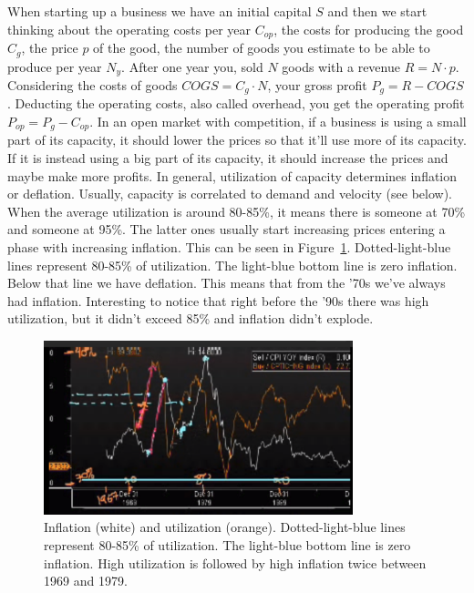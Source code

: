 When starting up a business we have an initial capital $S$ and then we start thinking about the operating costs per year $C_{op}$, the costs for producing the good $C_g$, the price $p$ of the good, the number of goods you estimate to be able to produce per year $N_y$. After one year you, sold $N$ goods with a revenue $R = N \cdot p$. Considering the costs of goods $COGS = C_g \cdot N$, your gross profit $P_g = R - COGS$. Deducting the operating costs, also called overhead, you get the operating profit $P_{op} = P_g - C_{op}$. 
In an open market with competition, if a business is using a small part of its capacity, it should lower the prices so that it'll use more of its capacity. If it is instead using a big part of its capacity, it should increase the prices and maybe make more profits. In general, utilization of capacity determines inflation or deflation. Usually, capacity is correlated to demand and velocity (see below). When the average utilization is around 80-85\%, it means there is someone at 70\% and someone at 95\%. The latter ones usually start increasing prices entering a phase with increasing inflation. This can be seen in Figure~\ref{fig:inflation_utilization}. Dotted-light-blue lines represent 80-85\% of utilization. The light-blue bottom line is zero inflation. Below that line we have deflation. This means that from the '70s we've always had inflation. Interesting to notice that right before the '90s there was high utilization, but it didn't exceed 85\% and inflation didn't explode.

\begin{figure}[h!]
\centering
\includegraphics[width=0.8\textwidth]{images/inflation_utilization.png}
\caption{Inflation (white) and utilization (orange). Dotted-light-blue lines represent 80-85\% of utilization. The light-blue bottom line is zero inflation. High utilization is followed by high inflation twice between 1969 and 1979.}
\label{fig:inflation_utilization}
\end{figure}

